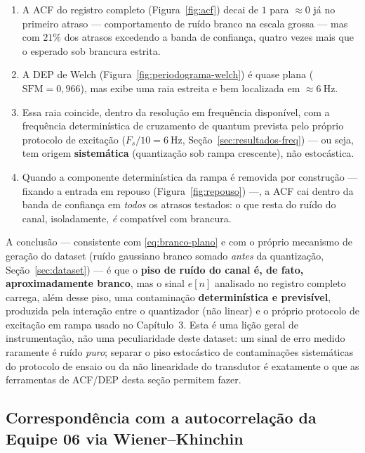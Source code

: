 \begin{enumerate}[leftmargin=1.6em]
\item A ACF do registro completo (Figura~\ref{fig:acf}) decai de $1$ para $\approx 0$ já no
      primeiro atraso --- comportamento de ruído branco na escala grossa --- mas com $21\%$ dos
      atrasos excedendo a banda de confiança, quatro vezes mais que o esperado sob brancura
      estrita.
\item A DEP de Welch (Figura~\ref{fig:periodograma-welch}) é quase plana
      ($\text{SFM}=0{,}966$), mas exibe uma raia estreita e bem localizada em
      $\approx\! 6\ \text{Hz}$.
\item Essa raia coincide, dentro da resolução em frequência disponível, com a frequência
      determinística de cruzamento de quantum prevista pelo próprio protocolo de excitação
      ($F_s/10=6\ \text{Hz}$, Seção~\ref{sec:resultados-freq}) --- ou seja, tem origem
      \textbf{sistemática} (quantização sob rampa crescente), não estocástica.
\item Quando a componente determinística da rampa é removida por construção --- fixando a entrada
      em repouso (Figura~\ref{fig:repouso}) ---, a ACF cai dentro da banda de confiança em
      \emph{todos} os atrasos testados: o que resta do ruído do canal, isoladamente, \emph{é}
      compatível com brancura.
\end{enumerate}

A conclusão --- consistente com \eqref{eq:branco-plano} e com o próprio mecanismo de geração do
dataset (ruído gaussiano branco somado \emph{antes} da quantização, Seção~\ref{sec:dataset}) ---
é que o \textbf{piso de ruído do canal é, de fato, aproximadamente branco}, mas o sinal
$e[n]$ analisado no registro completo carrega, além desse piso, uma contaminação
\textbf{determinística e previsível}, produzida pela interação entre o quantizador (não linear)
e o próprio protocolo de excitação em rampa usado no Capítulo~3. Esta é uma lição geral de
instrumentação, não uma peculiaridade deste dataset: um sinal de erro medido raramente é ruído
\emph{puro}; separar o piso estocástico de contaminações sistemáticas do protocolo de ensaio ou
da não linearidade do transdutor é exatamente o que as ferramentas de ACF/DEP desta seção
permitem fazer.

\subsection{Correspondência com a autocorrelação da Equipe 06 via Wiener--Khinchin}

